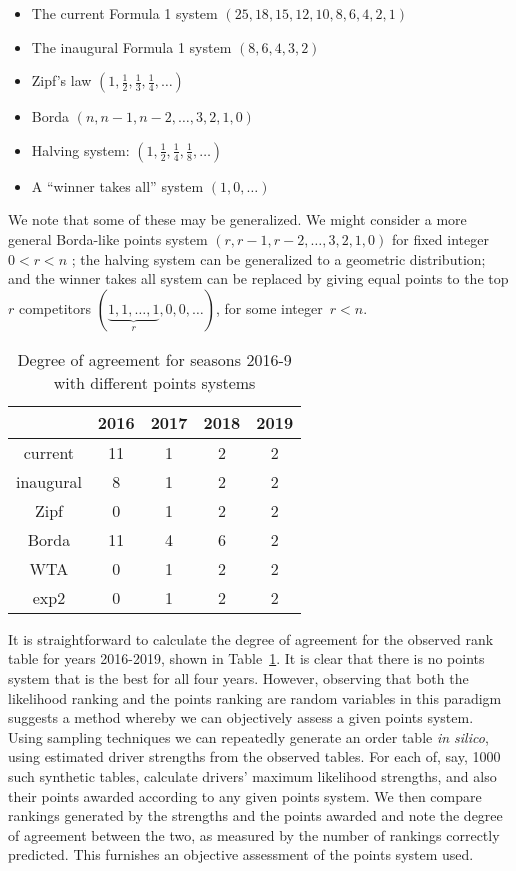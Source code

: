 \documentclass{elsarticle}
\begin{document}
\begin{itemize}
\item The current Formula 1 system $(25,18,15,12,10,8,6,4,2,1)$
\item The inaugural Formula 1 system $(8,6,4,3,2)$
\item Zipf's law $(1,\frac{1}{2},\frac{1}{3},\frac{1}{4},\ldots)$
\item Borda $(n,n-1,n-2,\ldots,3,2,1,0)$
\item Halving system:  $(1,\frac{1}{2},\frac{1}{4},\frac{1}{8},\ldots)$
\item A ``winner takes all'' system $(1,0,\ldots)$
\end{itemize}

We note that some of these may be generalized.  We might consider a
more general Borda-like points system $(r,r-1,r-2,\ldots,3,2,1,0)$ for
fixed integer $0<r<n$ \citep{emerson2007}; the halving system can be
generalized to a geometric distribution; and the winner takes all
system can be replaced by giving equal points to the top \(r\)
competitors $(\underbrace{1,1,\ldots ,1}_{r},0,0,\ldots)$, for some
integer~$r<n$.

\begin{table}
\centering
\begin{tabular}{ |c|c|c|c|c|}
 \hline
         &    2016 & 2017 & 2018 & 2019\\ \hline
current  &    11   & 1    & 2    & 2   \\
inaugural&     8   & 1    & 2    & 2   \\
Zipf     &     0   & 1    & 2    & 2   \\
Borda    &    11   & 4    & 6    & 2   \\
WTA      &     0   & 1    & 2    & 2   \\
exp2     &     0   & 1    & 2    & 2   \\
 \hline
\end{tabular}
\caption{\doublespacing Degree of agreement for seasons 2016-9 with
  different \label{doapoints} points systems}
\end{table}


It is straightforward to calculate the degree of agreement for the
observed rank table for years 2016-2019, shown in
Table~\ref{doapoints}.  It is clear that there is no points system
that is the best for all four years.  However, observing that both the
likelihood ranking and the points ranking are random variables in this
paradigm suggests a method whereby we can objectively assess a given
points system.  Using sampling techniques we can repeatedly generate
an order table \emph{in silico}, using estimated driver strengths from
the observed tables.  For each of, say, 1000 such synthetic tables,
calculate drivers' maximum likelihood \citeauthor{plackett1975}
strengths, and also their points awarded according to any given points
system.  We then compare rankings generated by the
\citeauthor{plackett1975} strengths and the points awarded and note
the degree of agreement between the two, as measured by the number of
rankings correctly predicted.  This furnishes an objective assessment
of the points system used.
\end{document}
